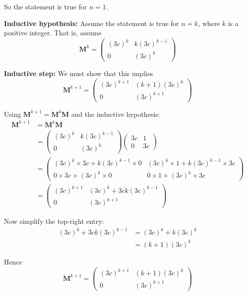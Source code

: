 \documentclass[leqno]{article}
\begin{document}
\begin{enumerate}[
  label=\textbf{\arabic*.},
  leftmargin=*,
  topsep=0pt,
  partopsep=0pt,
  parsep=0pt
]
\begin{djsSolution}
\begin{enumerate}[label=\textbf{(\alph*)}]
  So the statement is true for $n=1$.

  \textbf{Inductive hypothesis:} Assume the statement is true for $n=k$, where $k$ is a positive integer. That is, assume
  \[
  \mathbf{M}^k=\begin{pmatrix}(3c)^k & k(3c)^{k-1}\\0&(3c)^k\end{pmatrix}
  \]

  \textbf{Inductive step:} We must show that this implies
  \[
  \mathbf{M}^{k+1}=\begin{pmatrix}(3c)^{k+1} & (k+1)(3c)^k\\0&(3c)^{k+1}\end{pmatrix}
  \]

  Using $\mathbf{M}^{k+1}=\mathbf{M}^k\mathbf{M}$ and the inductive hypothesis:
  \begin{align*}
  \mathbf{M}^{k+1}
  &= \mathbf{M}^k\mathbf{M} \\
  &= \begin{pmatrix}(3c)^k & k(3c)^{k-1}\\0&(3c)^k\end{pmatrix}
     \begin{pmatrix}3c&1\\0&3c\end{pmatrix} \\
  &= \begin{pmatrix}
  (3c)^k\times 3c + k(3c)^{k-1}\times 0
  &
  (3c)^k\times 1 + k(3c)^{k-1}\times 3c
  \\
  0\times 3c + (3c)^k\times 0
  &
  0\times 1 + (3c)^k\times 3c
  \end{pmatrix} \\
  &= \begin{pmatrix}
  (3c)^{k+1}
  &
  (3c)^k + 3ck(3c)^{k-1}
  \\
  0
  &
  (3c)^{k+1}
  \end{pmatrix}
  \end{align*}

  Now simplify the top-right entry:
  \begin{align*}
  (3c)^k + 3ck(3c)^{k-1}
  &= (3c)^k + k(3c)^k \\
  &= (k+1)(3c)^k
  \end{align*}

  Hence
  \[
  \mathbf{M}^{k+1}
  =
  \begin{pmatrix}(3c)^{k+1} & (k+1)(3c)^k\\0&(3c)^{k+1}\end{pmatrix}
  \]


\end{enumerate}
\end{djsSolution}
\end{enumerate}
\end{document}
